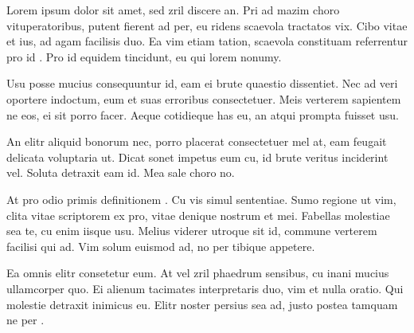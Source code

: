Lorem ipsum dolor sit amet, sed zril discere an. Pri ad mazim choro vituperatoribus, putent fierent ad per, eu ridens scaevola tractatos vix. Cibo vitae et ius, ad agam facilisis duo. Ea vim etiam tation, scaevola constituam referrentur pro id \cite{pmid25877226}. Pro id equidem tincidunt, eu qui lorem nonumy.

Usu posse mucius consequuntur id, eam ei brute quaestio dissentiet. Nec ad veri oportere indoctum, eum et suas erroribus consectetuer. Meis verterem sapientem ne eos, ei sit porro facer. Aeque cotidieque has eu, an atqui prompta fuisset usu.

An elitr aliquid bonorum nec, porro placerat consectetuer mel at, eam feugait delicata voluptaria ut. Dicat sonet impetus eum cu, id brute veritus inciderint vel. Soluta detraxit eam id. Mea sale choro no.

At pro odio primis definitionem \cite{pmid20061746}. Cu vis simul sententiae. Sumo regione ut vim, clita vitae scriptorem ex pro, vitae denique nostrum et mei. Fabellas molestiae sea te, cu enim iisque usu. Melius viderer utroque sit id, commune verterem facilisi qui ad. Vim solum euismod ad, no per tibique appetere.

Ea omnis elitr consetetur eum. At vel zril phaedrum sensibus, cu inani mucius ullamcorper quo. Ei alienum tacimates interpretaris duo, vim et nulla oratio. Qui molestie detraxit inimicus eu. Elitr noster persius sea ad, justo postea tamquam ne per \cite{pmid19584464}.